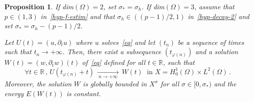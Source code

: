 \documentclass[11pt]{article}
\newtheorem{prop}[theo]{Proposition}
\theoremstyle{definition}
\numberwithin{equation}{section}
\numberwithin{figure}{section}
\numberwithin{table}{section}
\newcommand{\RR}{\mathbb{R}}
\let\oldforall\forall
\renewcommand*{\forall}{\mathrel{\oldforall}}
\begin{document}
\begin{prop}\label{prop-asymp-compact-1}
If dim$(\Omega)=2$, set $\sigma_*=\sigma_h$. If dim$(\Omega)=3$, assume that $p\in(1,3)$ in~\eqref{hyp-f-estim} and that $\sigma_h\in ((p-1)/2,1)$ in~\eqref{hyp-decay-2} and set $\sigma_*=\sigma_h - (p-1)/2$.

Let $U(t)=(u,\partial_t u)$ where $u$ solves~\eqref{eq} and let $(t_n)$ be a sequence of times such that $t_n\rightarrow +\infty$. Then, there exist a subsequence $(t_{\varphi(n)})$ and a solution $W(t)=(w,\partial_t w)(t)$ of~\eqref{eq} defined for all $t\in\RR$, such that
\[
\forall
t\in\RR\,,\,U(t_{\varphi(n)}+t)\,\xrightarrow[\:n\longrightarrow
+\infty\;]{}\,W(t)\;\text{ in }X=H^1_0(\Omega)\times L^2(\Omega)\,.
\]
Moreover, the solution $W$ is globally bounded in $X^\sigma$ for all $\sigma\in [0,\sigma_*)$ and the energy $E(W(t))$ is constant.
\end{prop}
\end{document}
